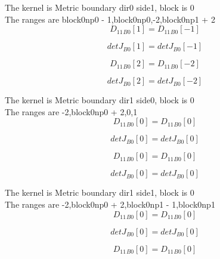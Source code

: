 \documentclass{article}
\begin{document}
\noindent The kernel is Metric boundary dir0 side1, block is 0\\\noindent The ranges are block0np0 - 1,block0np0,-2,block0np1 + 2\\\begin{dmath}{D_{11}{_{B0}}}[{1}] = {D_{11}{_{B0}}}[{-1}]\end{dmath}

\begin{dmath}{detJ{_{B0}}}[{1}] = {detJ{_{B0}}}[{-1}]\end{dmath}

\begin{dmath}{D_{11}{_{B0}}}[{2}] = {D_{11}{_{B0}}}[{-2}]\end{dmath}

\begin{dmath}{detJ{_{B0}}}[{2}] = {detJ{_{B0}}}[{-2}]\end{dmath}

\noindent The kernel is Metric boundary dir1 side0, block is 0\\\noindent The ranges are -2,block0np0 + 2,0,1\\\begin{dmath}{D_{11}{_{B0}}}[{0}] = {D_{11}{_{B0}}}[{0}]\end{dmath}

\begin{dmath}{detJ{_{B0}}}[{0}] = {detJ{_{B0}}}[{0}]\end{dmath}

\begin{dmath}{D_{11}{_{B0}}}[{0}] = {D_{11}{_{B0}}}[{0}]\end{dmath}

\begin{dmath}{detJ{_{B0}}}[{0}] = {detJ{_{B0}}}[{0}]\end{dmath}

\noindent The kernel is Metric boundary dir1 side1, block is 0\\\noindent The ranges are -2,block0np0 + 2,block0np1 - 1,block0np1\\\begin{dmath}{D_{11}{_{B0}}}[{0}] = {D_{11}{_{B0}}}[{0}]\end{dmath}

\begin{dmath}{detJ{_{B0}}}[{0}] = {detJ{_{B0}}}[{0}]\end{dmath}

\begin{dmath}{D_{11}{_{B0}}}[{0}] = {D_{11}{_{B0}}}[{0}]\end{dmath}
\end{document}
